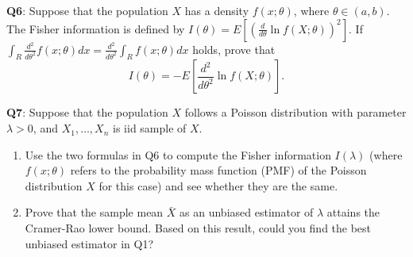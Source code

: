 \documentclass[]{article}
\begin{document}
\textbf{Q6}: Suppose that the population \(X\) has a density
\(f(x;\theta)\), where \(\theta\in (a,b)\). The Fisher information is
defined by \(I(\theta) = E[(\frac{d}{d\theta}\ln f(X;\theta))^2]\). If
\(\int_R\frac{d^2}{d\theta^2} f(x;\theta)d x = \frac{d^2}{d\theta^2}\int_R f(x;\theta)d x\)
holds, prove that
\[I(\theta)= -E\left[\frac{d^2}{d\theta^2} \ln f(X;\theta)\right].\]

\textbf{Q7}: Suppose that the population \(X\) follows a Poisson
distribution with parameter \(\lambda>0\), and \(X_1,\dots, X_n\) is iid
sample of \(X\).

\begin{enumerate}
\def\labelenumi{\arabic{enumi}.}
\item
  Use the two formulas in Q6 to compute the Fisher information
  \(I(\lambda)\) (where \(f(x;\theta)\) refers to the probability mass
  function (PMF) of the Poisson distribution \(X\) for this case) and
  see whether they are the same.
\item
  Prove that the sample mean \(\bar X\) as an unbiased estimator of
  \(\lambda\) attains the Cramer-Rao lower bound. Based on this result,
  could you find the best unbiased estimator in Q1?
\end{enumerate}
\end{document}
